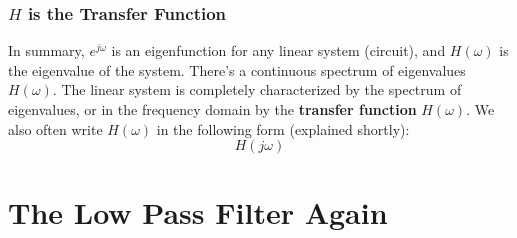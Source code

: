 \subsubsection{$H$ is the Transfer Function}
In summary, $e^{j\omega}$ is an eigenfunction for any linear system (circuit), and $H(\omega)$ is the eigenvalue of the system.  There's a continuous spectrum of eigenvalues $H(\omega)$.   The linear system is completely characterized by the spectrum of eigenvalues, or in the frequency domain by the \textbf{transfer function} $H(\omega)$.  We also often write $H(\omega)$ in the following form (explained shortly):
    \begin{equation}
        H(j\omega)
    \end{equation}
\section{The Low Pass Filter Again}
